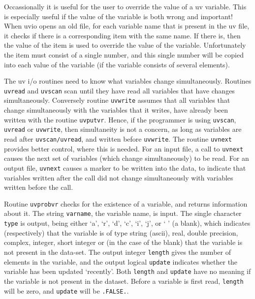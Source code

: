 
Occassionally it is useful for the user to override the value of a uv variable.
This is especially useful if the value of the variable is both wrong and
important! When uvio opens an old file, for each variable name that is
present in the uv file, it checks if there is a corresponding item with
the same name. If there is, then the value of the item is used to override
the value of the variable. Unfortunately the item must consist of a single
number, and this single number will be copied into each value of the variable
(if the variable consists of several elements).


The uv i/o routines need to know what variables change simultaneously.
Routines {\tt uvread} and {\tt uvscan} scan until they have read
all variables that have changes simultaneously. Conversely routine
{\tt uvwrite} assumes that all variables that change simultaneously with
the variables that it writes, have already been written with the routine
{\tt uvputvr}. Hence, if the programmer is using {\tt uvscan}, {\tt uvread} or
{\tt uvwrite}, then simultaneity is not a concern, as long as variables are
read after {\tt uvscan/uvread}, and written before {\tt uvwrite}. The routine
{\tt uvnext} provides better control, where this is needed. For an input
file, a call to {\tt uvnext} causes the next set of variables (which
change simultaneously) to be read. For an output file, {\tt uvnext} causes
a marker to be written into the data, to indicate that variables written
after the call did not change simultaneously with variables written before
the call.


Routine {\tt uvprobvr} checks for the existence of a variable, and
returns information about it. The string {\tt varname}, the variable name,
is input. The single character {\tt type} is output, being either
`a', `r', `d', `c', `i', `j', or ` ' (a blank), which indicates (respectively)
that the variable is of type string (ascii), real, double precision, complex,
integer, short integer or (in the case of the blank) that the variable is not
present in the data-set.  The output integer {\tt length} gives the number of
elements in the variable, and the output logical {\tt update} indicates
whether the variable has been updated `recently'.  Both {\tt length} and
{\tt update} have no meaning if the variable is not present in the dataset.
Before a variable is first read, {\tt length} will be zero, and {\tt update}
will be {\tt .FALSE.}.

